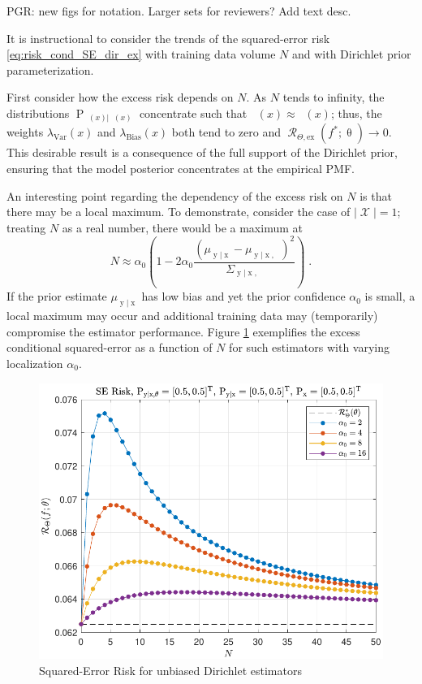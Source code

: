 \documentclass{article}
\DeclareMathOperator{\xrm}{\mathrm{x}}
\DeclareMathOperator{\yrm}{\mathrm{y}}
\DeclareMathOperator{\Prm}{\mathrm{P}}
\DeclareMathOperator{\Xcal}{\mathcal{X}}
\DeclareMathOperator{\Rcal}{\mathcal{R}}
\DeclareMathOperator{\thetam}{\theta_\text{m}}
\DeclareMathOperator{\upthetam}{\uptheta_\text{m}}
\DeclareMathOperator{\upthetac}{\uptheta_\text{c}}
\DeclareMathOperator{\uppsim}{\uppsi_\text{m}}
\begin{document}
PGR: new figs for notation. Larger sets for reviewers? Add text desc.


It is instructional to consider the trends of the squared-error risk \eqref{eq:risk_cond_SE_dir_ex} with training data volume $N$ and with Dirichlet prior parameterization. 

First consider how the excess risk depends on $N$. As $N$ tends to infinity, the distributions $\Prm_{\uppsim(x) | \upthetam(x)}$ concentrate such that $\uppsim(x) \approx \thetam(x)$; thus, the weights $\lambda_{\text{Var}}(x)$ and $\lambda_{\text{Bias}}(x)$ both tend to zero and $\Rcal_{\Theta, \mathrm{ex}}(f^* ; \uptheta) \to 0$. This desirable result is a consequence of the full support of the Dirichlet prior, ensuring that the model posterior concentrates at the empirical PMF.

An interesting point regarding the dependency of the excess risk on $N$ is that there may be a local maximum. To demonstrate, consider the case of $|\Xcal| = 1$; treating $N$ as a real number, there would be a maximum at 
\begin{equation}
N \approx \alpha_0 \left( 1 - 2 \alpha_0 \frac{\left( \mu_{\yrm | \xrm} - \mu_{\yrm | \xrm,\upthetac} \right)^2}{\Sigma_{\yrm | \xrm,\upthetac}} \right) \;.
\end{equation}
If the prior estimate $\mu_{\yrm | \xrm}$ has low bias and yet the prior confidence $\alpha_0$ is small, a local maximum may occur and additional training data may (temporarily) compromise the estimator performance. Figure \ref{fig:Risk_cond_SE_Dir_N_leg_a0_unbiased} exemplifies the excess conditional squared-error as a function of $N$ for such estimators with varying localization $\alpha_0$. 
\begin{figure}
	\centering
	\includegraphics[width=0.9\linewidth]{Risk_cond_SE_Dir_N_leg_a0_unbiased.pdf}
	\caption{Squared-Error Risk for unbiased Dirichlet estimators}
	\label{fig:Risk_cond_SE_Dir_N_leg_a0_unbiased}
\end{figure}
\end{document}

